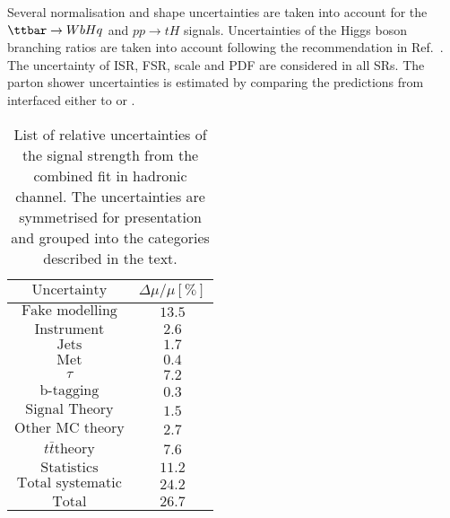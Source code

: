 Several normalisation and shape uncertainties are taken into account for the $\Hq$ and $pp\to tH$ signals.
Uncertainties of the Higgs boson branching ratios are taken into account
following the recommendation in Ref.~\cite{deFlorian:2016spz}.
The uncertainty of ISR, FSR, scale and PDF are considered in all SRs. The parton shower uncertainties is estimated by comparing the predictions from {\powheg} interfaced either to {\pythiaeight} or {}. 



\begin{table}[htbp]
\caption{List of relative uncertainties of the signal strength from the combined fit in hadronic channel. The uncertainties are symmetrised for presentation and grouped into the categories described in the text. %
}
\small
\centering
\begin{tabular}{cc} \toprule\toprule
$\text{Uncertainty}    $   & $\Delta\mu/\mu[\%]$ \\\midrule
$\text{Fake modelling} $   & $13.5$ \\
$\text{Instrument}     $   & $2.6$  \\
$\text{Jets}           $   & $1.7$   \\
$\text{Met}            $   & $0.4$   \\
$\tau                  $   & $7.2$    \\
$\text{b-tagging}       $  & $0.3$    \\
$\text{Signal Theory}  $   & $1.5$   \\
$\text{Other MC theory} $  & $2.7$    \\
$t\bar{t} \text{theory}$  & $7.6$     \\\midrule
$\text{Statistics}      $  & $11.2$   \\
$\text{Total systematic}$  & $24.2$  \\ \midrule
$\text{Total}  $           & $26.7$ \\
\bottomrule\bottomrule
\end{tabular}
\label{tab:had_sys_impact}
\end{table} 


